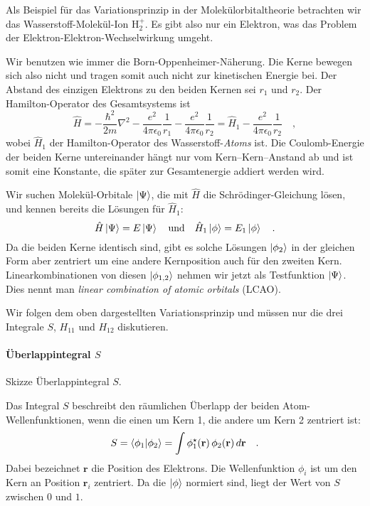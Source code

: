 Als Beispiel für das Variationsprinzip in der Molekülorbitaltheorie betrachten wir das Wasserstoff-Molekül-Ion H$_2^+$. Es gibt also nur ein Elektron, was das Problem der Elektron-Elektron-Wechselwirkung umgeht.

Wir benutzen wie immer die Born-Oppenheimer-Näherung. Die Kerne bewegen sich also nicht und tragen somit auch nicht zur kinetischen Energie bei. Der Abstand des einzigen Elektrons zu den beiden Kernen sei $r_1$ und $r_2$. Der Hamilton-Operator des Gesamtsystems ist
\begin{equation}
\hat{H} =  - \frac{\hbar^2}{2 m} \nabla^2 - \frac{e^2}{4 \pi \epsilon_0} \frac{1}{r_{1}} - \frac{e^2}{4 \pi \epsilon_0} \frac{1}{r_{2}}
= \hat{H}_1  - \frac{e^2}{4 \pi \epsilon_0} \frac{1}{r_{2}} \quad ,
\end{equation} 
wobei $\hat{H}_1 $ der Hamilton-Operator des Wasserstoff-\emph{Atoms} ist. Die Coulomb-Energie der beiden Kerne untereinander hängt nur vom Kern--Kern--Anstand ab und ist somit eine Konstante, die später zur Gesamtenergie addiert werden wird.

Wir suchen Molekül-Orbitale $\ket{\Psi}$, die mit $\hat{H}$ die Schrödinger-Gleichung lösen, und kennen bereits die Lösungen für $\hat{H}_1$:
\begin{equation}
\hat{H} \ket{\Psi} = E \ket{\Psi} \quad \text{und} \quad 
\hat{H}_1 \ket{\phi} = E_1 \ket{\phi}  \quad .
\end{equation}
Da die beiden Kerne identisch sind, gibt es solche Lösungen $\ket{\phi_2}$ in der gleichen Form aber zentriert um eine andere Kernposition auch für den zweiten Kern. Linearkombinationen von diesen  $\ket{\phi_{1,2}}$ nehmen wir jetzt als Testfunktion $\ket{\Psi}$. Dies nennt man \emph{linear combination of atomic orbitals} (LCAO).

Wir folgen dem oben dargestellten Variationsprinzip und müssen nur die drei Integrale $S$, $ H_{11}$ und $H_{12}$ diskutieren.

\paragraph{Überlappintegral $S$} 
\begin{marginfigure}
\caption{Skizze   Überlappintegral $S$. }
\end{marginfigure}
%
Das Integral $S$ beschreibt den räumlichen Überlapp der beiden Atom-Wellenfunktionen, wenn die einen um Kern 1, die andere um Kern 2 zentriert ist:
\begin{equation}
 S = \braket{\phi_1 | \phi_2} = \int \phi_1^\star( \mathbf{r} )  \, \phi_2( \mathbf{r})   \, d\mathbf{r} \quad .
\end{equation}
Dabei bezeichnet $\mathbf{r}$ die Position des Elektrons. Die Wellenfunktion $\phi_i$ ist um den Kern an Position $\mathbf{r}_{i}$ zentriert. Da die $\ket{\phi}$ normiert sind, liegt der Wert von $S$ zwischen $0$ und $1$.






